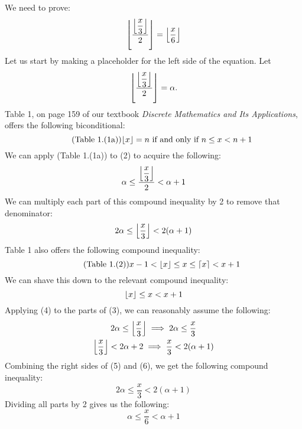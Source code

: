 \documentclass{article}
\DeclarePairedDelimiter{\floor}{\lfloor}{\rfloor}
\DeclarePairedDelimiter{\ceil}{\lceil}{\rceil}
\begin{document}
\section{}
We need to prove:
\begin{equation} 
    \floor*{ \frac{\floor*{\dfrac{x}{3}}}{2} } = \floor*{ \frac{x}{6} }
\end{equation}
Let us start by making a placeholder for the left side of the equation. Let
\begin{equation} 
    \floor*{ \frac{\floor*{\dfrac{x}{3}}}{2} } = \alpha.
\end{equation}
Table 1, on page 159 of our textbook \emph{Discrete Mathematics and Its 
Applications}, offers the following biconditional:
\begin{equation} \tag{Table 1.(1a)}
    \floor{x} = n \text{ if and only if } n \leq x < n+1
\end{equation}
We can apply (Table 1.(1a)) to (2) to acquire the following:
\begin{equation*}
    \alpha \leq \frac{\floor*{\dfrac{x}{3}}}{2} < \alpha + 1
\end{equation*}
We can multiply each part of this compound inequality by 2 to
remove that denominator:
\begin{equation}
    2\alpha \leq \floor*{\dfrac{x}{3}} < 2(\alpha + 1)
\end{equation}
Table 1 also offers the following compound inequality:
\begin{equation*} \tag{Table 1.(2)}
    x-1 < \floor{x} \leq x \leq \ceil{x} < x+1
\end{equation*}
We can shave this down to the relevant compound inequality:
\begin{equation}
    \floor{x} \leq x < x+1
\end{equation}
Applying (4) to the parts of (3), we can reasonably assume the following:
\begin{gather}
    2 \alpha \leq \floor*{\dfrac{x}{3}} \implies 2 \alpha \leq \dfrac{x}{3} \\
    \floor*{\dfrac{x}{3}} < 2\alpha +2 \implies \dfrac{x}{3} < 2(\alpha + 1)
\end{gather}
Combining the right sides of (5) and (6), we get the following compound inequality:
\begin{equation*}
    2 \alpha \leq \dfrac{x}{3} < 2(\alpha + 1)
\end{equation*}
Dividing all parts by 2 gives us the following:
\begin{equation}
    \alpha \leq \dfrac{x}{6} < \alpha + 1
\end{equation}
\end{document}
